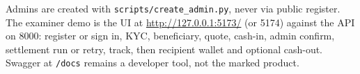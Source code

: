 \documentclass[11pt]{article}
\begin{document}
Admins are created with \texttt{scripts/create\_admin.py}, never via public register. The examiner demo is the UI at \url{http://127.0.0.1:5173/} (or 5174) against the API on 8000: register or sign in, KYC, beneficiary, quote, cash-in, admin confirm, settlement run or retry, track, then recipient wallet and optional cash-out. Swagger at \texttt{/docs} remains a developer tool, not the marked product.



\end{document}
